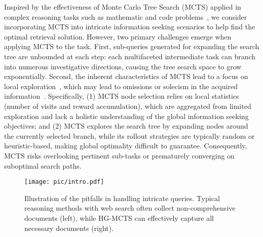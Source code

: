 Inspired by the effectiveness of Monte Carlo Tree Search (MCTS) applied in complex reasoning tasks such as mathematic and code problems~\cite{alphago, YeLKAG21}, we consider incorporating MCTS into intricate information seeking scenarios to help find the optimal retrieval solution. However, two primary challenges emerge when applying MCTS to the task. First, sub-queries generated for expanding the search tree are unbounded at each step: each multifaceted intermediate task can branch into numerous investigative directions, causing the tree search space to grow exponentially. Second, the inherent characteristics of MCTS lead to a focus on local exploration~\cite{browne2012survey}, which may lead to omissions or solecism in the acquired information~\cite{_wiechowski_2022}. Specifically, (1) MCTS node selection relies on local statistics (\eg number of visits and reward accumulation), which are aggregated from limited exploration and lack a holistic understanding of the global information seeking objectives; and (2) MCTS explores the search tree by expanding nodes around the currently selected branch, while its rollout strategies are typically random or heuristic-based, making global optimality difficult to guarantee. Consequently, MCTS risks overlooking pertinent sub-tasks or prematurely converging on suboptimal search paths.


\begin{figure}
    \centering
    \texttt{[image: pic/intro.pdf]}
    \caption{Illustration of the pitfalls in handling intricate queries. Typical reasoning methods with web search often collect non-comprehensive documents (left), while HG-MCTS can effectively capture all necessary documents (right).}
    \label{fig:intro}
\end{figure}


